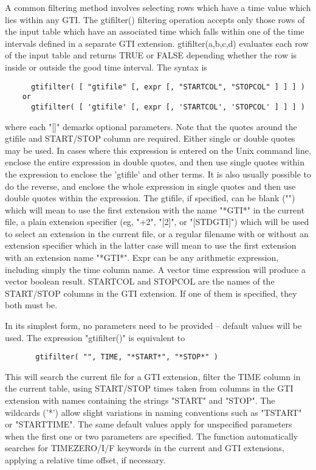 \documentclass[11pt]{book}
\begin{document}
    A common filtering method involves selecting rows which have a
    time value which lies within any GTI.  The gtifilter() filtering
    operation accepts only those rows of the input table which have an
    associated time which falls within one of the time intervals
    defined in a separate GTI extension.  gtifilter(a,b,c,d) evaluates
    each row of the input table and returns TRUE or FALSE depending
    whether the row is inside or outside the good time interval.  The
    syntax is

\begin{verbatim}
      gtifilter( [ "gtifile" [, expr [, "STARTCOL", "STOPCOL" ] ] ] )
    or
      gtifilter( [ 'gtifile' [, expr [, 'STARTCOL', 'STOPCOL' ] ] ] )
\end{verbatim}
    where  each "[]" demarks optional parameters.  Note that  the quotes
    around the gtifile and START/STOP column are required.  Either single
    or double quotes may be used.  In cases where this expression is
    entered on the Unix command line, enclose the entire expression in
    double quotes, and then use single quotes within the expression to
    enclose the 'gtifile' and other terms.  It is also usually possible
    to do the reverse, and enclose the whole expression in single quotes
    and then use double quotes within the expression.  The gtifile,
    if specified,  can be blank  ("") which will  mean to use  the first
    extension  with   the name "*GTI*"  in   the current  file,  a plain
    extension  specifier (eg, "+2",  "[2]", or "[STDGTI]") which will be
    used  to  select  an extension  in  the current  file, or  a regular
    filename with or without an extension  specifier which in the latter
    case  will mean to  use the first  extension  with an extension name
    "*GTI*".  Expr can be   any arithmetic expression, including  simply
    the time  column  name.  A  vector  time expression  will  produce a
    vector boolean  result.  STARTCOL and  STOPCOL are the  names of the
    START/STOP   columns in the    GTI extension.  If   one  of them  is
    specified, they both  must be.

    In  its  simplest form, no parameters need to be provided -- default
    values will be used.  The expression "gtifilter()" is equivalent to

\begin{verbatim}
       gtifilter( "", TIME, "*START*", "*STOP*" )
\end{verbatim}
    This will search the current file for a GTI  extension,  filter  the
    TIME  column in the current table, using START/STOP times taken from
    columns in the GTI  extension  with  names  containing  the  strings
    "START"  and "STOP".  The wildcards ('*') allow slight variations in
    naming conventions  such  as  "TSTART"  or  "STARTTIME".   The  same
    default  values  apply for unspecified parameters when the first one
    or  two  parameters  are  specified.   The  function   automatically
    searches   for   TIMEZERO/I/F   keywords  in  the  current  and  GTI
    extensions, applying a relative time offset, if necessary.
\end{document}
